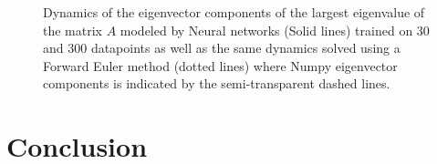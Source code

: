 \documentclass[reprint, english, nofootinbib]{revtex4-2}
\begin{document}
\begin{figure}[h!tb]
   \caption{\label{fig:eigenvector} Dynamics of the eigenvector components of the largest eigenvalue of the matrix $A$ modeled by Neural networks (Solid lines) trained on 30 and 300 datapoints as well as the same dynamics solved using a Forward Euler method (dotted lines) where Numpy eigenvector components is indicated by the semi-transparent dashed lines.}
\end{figure}


\section{Conclusion}

\onecolumngrid

\twocolumngrid
\end{document}
